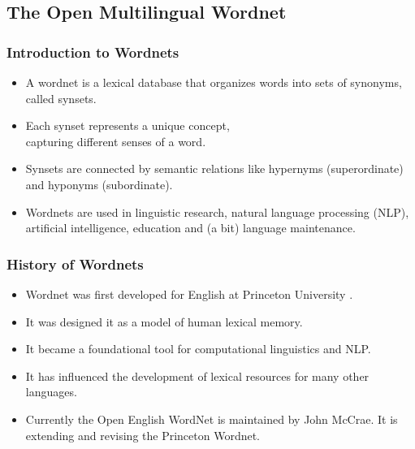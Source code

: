 \documentclass[xetex]{beamer}  %
\begin{document}
\subsection{The Open Multilingual Wordnet}
\begin{frame}
\frametitle{Introduction to Wordnets}

\begin{itemize}
    \item A wordnet is a lexical database that organizes words into sets of synonyms, called synsets.
    \item Each synset represents a unique concept,
      \\ capturing different senses of a word.
    \item Synsets are connected by semantic relations like hypernyms (superordinate) and hyponyms (subordinate).
    \item Wordnets are used in linguistic research, natural language processing (NLP), artificial intelligence, education and (a bit) language maintenance.
\end{itemize}
\end{frame}

\begin{frame}
\frametitle{History of Wordnets}

\begin{itemize}
\item Wordnet was first developed for English at Princeton University \citep{miller1995wordnet}.
  
    \item It was designed it as a model of human lexical memory.
    \item It became a foundational tool for computational linguistics and NLP.
    \item It has influenced the development of lexical resources for many other languages.
    \item Currently the Open English WordNet is maintained by John
      McCrae.  It is extending and revising the Princeton Wordnet.
\end{itemize}
\end{frame}
\end{document}
